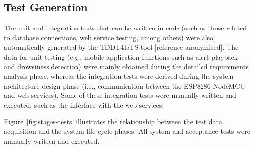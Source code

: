                 \subsection{Test Generation}
                The unit and integration tests that can be written in code (such as those related to database connections, web service testing, among others) were also automatically generated by the TDDT4IoTS tool [reference anonymised]. The data for unit testing (e.g., mobile application functions such as alert playback and drowsiness detection) were mainly obtained during the detailed requirements analysis phase, whereas the integration tests were derived during the system architecture design phase (i.e., communication between the ESP8286 NodeMCU and web services). Some of these integration tests were manually written and executed, such as the interface with the web services.
                
                Figure~\ref{fig:stages-tests} illustrates the relationship between the test data acquisition and the system life cycle phases. All system and acceptance tests were manually written and executed. 
                                

